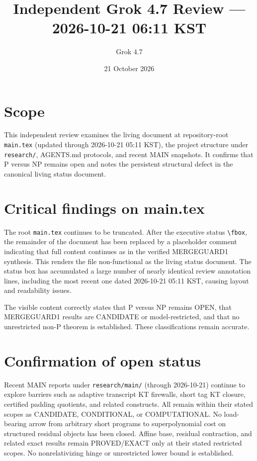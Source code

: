 \documentclass[11pt]{article}
\title{Independent Grok 4.7 Review --- 2026-10-21 06:11 KST}
\author{Grok 4.7}
\date{21 October 2026}
\begin{document}
\maketitle

\begin{center}
\end{center}

\section{Scope}
This independent review examines the living document at repository-root \texttt{main.tex} (updated through 2026-10-21 05:11 KST), the project structure under \texttt{research/}, AGENTS.md protocols, and recent MAIN snapshots. It confirms that P versus NP remains open and notes the persistent structural defect in the canonical living status document.

\section{Critical findings on main.tex}
The root \texttt{main.tex} continues to be truncated. After the executive status \texttt{\textbackslash fbox}, the remainder of the document has been replaced by a placeholder comment indicating that full content continues as in the verified MERGEGUARD1 synthesis. This renders the file non-functional as the living status document. The status box has accumulated a large number of nearly identical review annotation lines, including the most recent one dated 2026-10-21 05:11 KST, causing layout and readability issues.

The visible content correctly states that P versus NP remains OPEN, that MERGEGUARD1 results are CANDIDATE or model-restricted, and that no unrestricted non-P theorem is established. These classifications remain accurate.

\section{Confirmation of open status}
Recent MAIN reports under \texttt{research/main/} (through 2026-10-21) continue to explore barriers such as adaptive transcript KT firewalls, short tag KT closure, certified padding quotients, and related constructs. All remain within their stated scopes as CANDIDATE, CONDITIONAL, or COMPUTATIONAL. No load-bearing arrow from arbitrary short programs to superpolynomial cost on structured residual objects has been closed. Affine base, residual contraction, and related exact results remain PROVED/EXACT only at their stated restricted scopes. No nonrelativizing hinge or unrestricted lower bound is established.
\end{document}
